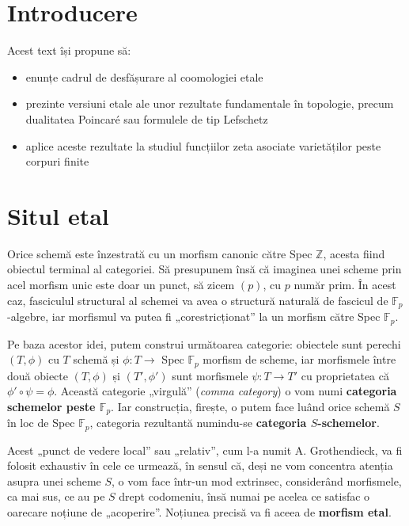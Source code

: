 \documentclass[13pt,openany]{book}
\begin{document}
\chapter{Introducere}

Acest text își propune să:

\begin{itemize}
\item enunțe cadrul de desfășurare al coomologiei etale
\item prezinte versiuni etale ale unor rezultate fundamentale în topologie, precum dualitatea Poincaré sau formulele de tip Lefschetz
\item aplice aceste rezultate la studiul funcțiilor zeta asociate varietăților peste corpuri finite
\end{itemize}

\cite{milne}\cite{lovering}\cite{dugger}

\newpage
\phantom{X}
\newpage

\pagestyle{headings}
\setcounter{secnumdepth}{2}

\chapter{Situl etal}
\setcounter{page}{1}

Orice schemă este înzestrată cu un morfism canonic către Spec $\mathbb{Z}$, acesta fiind obiectul terminal al categoriei. Să presupunem însă că imaginea unei scheme prin acel morfism unic este doar un punct, să zicem $(p)$, cu $p$ număr prim. În acest caz, fasciculul structural al schemei va avea o structură naturală de fascicul de $\mathbb{F}_p$-algebre, iar morfismul va putea fi „corestricționat” la un morfism către Spec $\mathbb{F}_p$.

Pe baza acestor idei, putem construi următoarea categorie: obiectele sunt perechi $(T,\phi)$ cu $T$ schemă și $\phi: T \rightarrow$ Spec $\mathbb{F}_p$ morfism de scheme, iar morfismele între două obiecte $(T,\phi)$ și $(T',\phi')$ sunt morfismele $\psi: T \rightarrow T'$ cu proprietatea că $\phi'\circ\psi=\phi$. Această categorie „virgulă” ({\it comma category}) o vom numi {\bf categoria schemelor peste $\mathbb{F}_p$}. Iar construcția, firește, o putem face luând orice schemă $S$ în loc de Spec $\mathbb{F}_p$, categoria rezultantă numindu-se {\bf categoria $S$-schemelor}.

Acest „punct de vedere local” sau „relativ”, cum l-a numit A. Grothendieck, va fi folosit exhaustiv în cele ce urmează, în sensul că, deși ne vom concentra atenția asupra unei scheme $S$, o vom face într-un mod extrinsec, considerând morfismele, ca mai sus, ce au pe $S$ drept codomeniu, însă numai pe acelea ce satisfac o oarecare noțiune de „acoperire”. Noțiunea precisă va fi aceea de {\bf morfism etal}.
\end{document}
